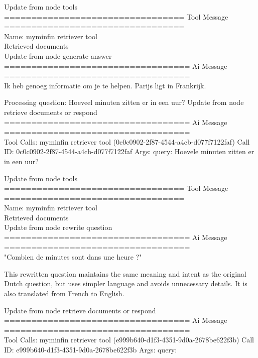 Update from node tools
\\[1em]
================================= Tool Message =================================
\\[1em]
Name: myminfin  retriever  tool
\\[1em]
Retrieved documents
\\[1em]
Update from node generate  answer
\\[1em]
================================== Ai Message ==================================
\\[1em]

Ik heb genoeg informatie om je te helpen. Parijs ligt in Frankrijk.



Processing question: Hoeveel minuten zitten er in een uur?
Update from node retrieve  documents  or  respond
\\[1em]
================================== Ai Message ==================================
\\[1em]
Tool Calls:
myminfin  retriever  tool (0c0c0902-2f87-4544-a4cb-d077f7122faf)
Call ID: 0c0c0902-2f87-4544-a4cb-d077f7122faf
Args:
query: Hoevele minuten zitten er in een uur?



Update from node tools
\\[1em]
================================= Tool Message =================================
\\[1em]
Name: myminfin  retriever  tool
\\[1em]
Retrieved documents
\\[1em]
Update from node rewrite  question
\\[1em]
================================== Ai Message ==================================
\\[1em]

"Combien de minutes sont dans une heure ?"

This rewritten question maintains the same meaning and intent as the original Dutch question, but uses simpler language and avoids unnecessary details. It is also translated from French to English.



Update from node retrieve  documents  or  respond
\\[1em]
================================== Ai Message ==================================
\\[1em]
Tool Calls:
myminfin  retriever  tool (e999b640-d1f3-4351-9d0a-2678be622f3b)
Call ID: e999b640-d1f3-4351-9d0a-2678be622f3b
Args:
query:



